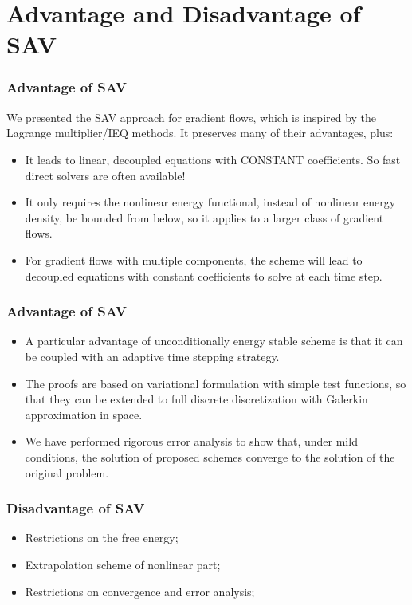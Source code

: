 \documentclass{beamer}
\begin{document}
    
    
\section{Advantage and Disadvantage of SAV}
\begin{frame}
\frametitle{Advantage of SAV}
We presented the SAV approach for gradient flows, which is inspired by the Lagrange multiplier/IEQ methods. It preserves many of their advantages, plus:
\begin{itemize}
  \item It leads to linear, decoupled equations with CONSTANT coefficients. So fast direct solvers are often available!
  \item It only requires the nonlinear energy functional, instead of nonlinear energy density, be bounded from below, so it applies to a larger class of gradient flows.
  \item For gradient flows with multiple components, the scheme will lead to decoupled equations with constant coefficients to solve at each time step.
\end{itemize}
\end{frame}
\begin{frame}
\frametitle{Advantage of SAV}
\begin{itemize}
  \item A particular advantage of unconditionally energy stable scheme is that it can be coupled with an adaptive time stepping strategy.
  \item The proofs are based on variational formulation with simple test functions, so that they can be extended to full discrete discretization with Galerkin approximation in space.
  \item We have performed rigorous error analysis to show that, under mild conditions, the solution of proposed schemes converge to the solution of the original problem.\cite{doi:10.1137/17M1159968}
\end{itemize}
\end{frame}
    \begin{frame}
\frametitle{Disadvantage of SAV}
    \begin{itemize}
      \item Restrictions on the free energy;
      \item Extrapolation scheme of nonlinear part;
      \item Restrictions on convergence and error analysis\cite{doi:10.1137/17M1159968};
    \end{itemize}


    \end{frame}
\end{document}
